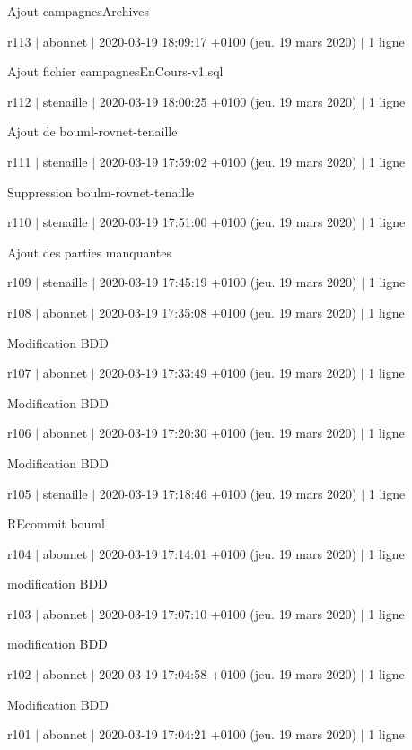 Ajout campagnes\+Archives

r113 $\vert$ abonnet $\vert$ 2020-\/03-\/19 18\+:09\+:17 +0100 (jeu. 19 mars 2020) $\vert$ 1 ligne

Ajout fichier campagnes\+En\+Cours-\/v1.\+sql

r112 $\vert$ stenaille $\vert$ 2020-\/03-\/19 18\+:00\+:25 +0100 (jeu. 19 mars 2020) $\vert$ 1 ligne

Ajout de bouml-\/rovnet-\/tenaille

r111 $\vert$ stenaille $\vert$ 2020-\/03-\/19 17\+:59\+:02 +0100 (jeu. 19 mars 2020) $\vert$ 1 ligne

Suppression boulm-\/rovnet-\/tenaille

r110 $\vert$ stenaille $\vert$ 2020-\/03-\/19 17\+:51\+:00 +0100 (jeu. 19 mars 2020) $\vert$ 1 ligne

Ajout des parties manquantes

r109 $\vert$ stenaille $\vert$ 2020-\/03-\/19 17\+:45\+:19 +0100 (jeu. 19 mars 2020) $\vert$ 1 ligne

r108 $\vert$ abonnet $\vert$ 2020-\/03-\/19 17\+:35\+:08 +0100 (jeu. 19 mars 2020) $\vert$ 1 ligne

Modification B\+DD

r107 $\vert$ abonnet $\vert$ 2020-\/03-\/19 17\+:33\+:49 +0100 (jeu. 19 mars 2020) $\vert$ 1 ligne

Modification B\+DD

r106 $\vert$ abonnet $\vert$ 2020-\/03-\/19 17\+:20\+:30 +0100 (jeu. 19 mars 2020) $\vert$ 1 ligne

Modification B\+DD

r105 $\vert$ stenaille $\vert$ 2020-\/03-\/19 17\+:18\+:46 +0100 (jeu. 19 mars 2020) $\vert$ 1 ligne

R\+Ecommit bouml

r104 $\vert$ abonnet $\vert$ 2020-\/03-\/19 17\+:14\+:01 +0100 (jeu. 19 mars 2020) $\vert$ 1 ligne

modification B\+DD

r103 $\vert$ abonnet $\vert$ 2020-\/03-\/19 17\+:07\+:10 +0100 (jeu. 19 mars 2020) $\vert$ 1 ligne

modification B\+DD

r102 $\vert$ abonnet $\vert$ 2020-\/03-\/19 17\+:04\+:58 +0100 (jeu. 19 mars 2020) $\vert$ 1 ligne

Modification B\+DD

r101 $\vert$ abonnet $\vert$ 2020-\/03-\/19 17\+:04\+:21 +0100 (jeu. 19 mars 2020) $\vert$ 1 ligne

